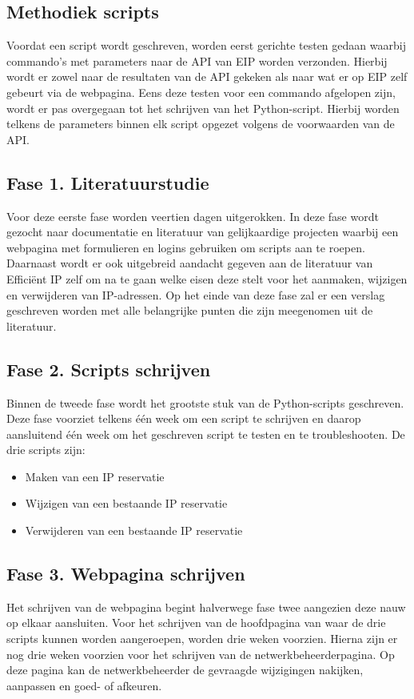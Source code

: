 \documentclass{hogent-article}
\begin{document}
\subsection{Methodiek scripts}
Voordat een script wordt geschreven, worden eerst gerichte testen gedaan waarbij commando's met parameters naar de API van EIP worden verzonden. Hierbij wordt er zowel naar de resultaten van de API gekeken als naar wat er op EIP zelf gebeurt via de webpagina. Eens deze testen voor een commando afgelopen zijn, wordt er pas overgegaan tot het schrijven van het Python-script. Hierbij worden telkens de parameters binnen elk script opgezet volgens de voorwaarden van de API.

\subsection{Fase 1. Literatuurstudie}
Voor deze eerste fase worden veertien dagen uitgerokken. In deze fase wordt gezocht naar documentatie en literatuur van gelijkaardige projecten waarbij een webpagina met formulieren en logins gebruiken om scripts aan te roepen. Daarnaast wordt er ook uitgebreid aandacht gegeven aan de literatuur van Efficiënt IP zelf om na te gaan welke eisen deze stelt voor het aanmaken, wijzigen en verwijderen van IP-adressen.
Op het einde van deze fase zal er een verslag geschreven worden met alle belangrijke punten die zijn meegenomen uit de literatuur.

\subsection{Fase 2. Scripts schrijven}
Binnen de tweede fase wordt het grootste stuk van de Python-scripts geschreven. Deze fase voorziet telkens één week om een script te schrijven en daarop aansluitend één week om het geschreven script te testen en te troubleshooten. De drie scripts zijn:
\begin{itemize}
    \item Maken van een IP reservatie
    \item Wijzigen van een bestaande IP reservatie
    \item Verwijderen van een bestaande IP reservatie
\end{itemize}

\subsection{Fase 3. Webpagina schrijven}
Het schrijven van de webpagina begint halverwege fase twee aangezien deze nauw op elkaar aansluiten.
Voor het schrijven van de hoofdpagina van waar de drie scripts kunnen worden aangeroepen, worden drie weken voorzien. Hierna zijn er nog drie weken voorzien voor het schrijven van de netwerkbeheerderpagina. Op deze pagina kan de netwerkbeheerder de gevraagde wijzigingen nakijken, aanpassen en goed- of afkeuren. 
\end{document}
